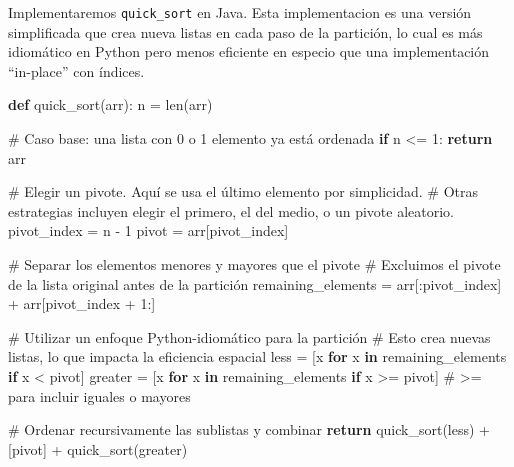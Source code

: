 \documentclass[
  spanish,
  letterpaper,
  DIV=11,
  numbers=noendperiod]{scrreprt}
\newenvironment{Shaded}{\begin{snugshade}}{\end{snugshade}}
\newcommand{\BuiltInTok}[1]{\textcolor[rgb]{0.00,0.23,0.31}{#1}}
\newcommand{\CommentTok}[1]{\textcolor[rgb]{0.37,0.37,0.37}{#1}}
\newcommand{\ControlFlowTok}[1]{\textcolor[rgb]{0.00,0.23,0.31}{\textbf{#1}}}
\newcommand{\DecValTok}[1]{\textcolor[rgb]{0.68,0.00,0.00}{#1}}
\newcommand{\KeywordTok}[1]{\textcolor[rgb]{0.00,0.23,0.31}{\textbf{#1}}}
\newcommand{\NormalTok}[1]{\textcolor[rgb]{0.00,0.23,0.31}{#1}}
\newcommand{\OperatorTok}[1]{\textcolor[rgb]{0.37,0.37,0.37}{#1}}
\begin{document}
Implementaremos \texttt{quick\_sort} en Java. Esta implementacion es una
versión simplificada que crea nueva listas en cada paso de la partición,
lo cual es más idiomático en Python pero menos eficiente en especio que
una implementación ``in-place'' con índices.

\begin{Shaded}
\begin{Highlighting}[]
\KeywordTok{def}\NormalTok{ quick\_sort(arr):}
\NormalTok{    n }\OperatorTok{=} \BuiltInTok{len}\NormalTok{(arr)}
    
    \CommentTok{\# Caso base: una lista con 0 o 1 elemento ya está ordenada}
    \ControlFlowTok{if}\NormalTok{ n }\OperatorTok{\textless{}=} \DecValTok{1}\NormalTok{:}
        \ControlFlowTok{return}\NormalTok{ arr}
    
    \CommentTok{\# Elegir un pivote. Aquí se usa el último elemento por simplicidad.}
    \CommentTok{\# Otras estrategias incluyen elegir el primero, el del medio, o un pivote aleatorio.}
\NormalTok{    pivot\_index }\OperatorTok{=}\NormalTok{ n }\OperatorTok{{-}} \DecValTok{1}
\NormalTok{    pivot }\OperatorTok{=}\NormalTok{ arr[pivot\_index]}
    
    \CommentTok{\# Separar los elementos menores y mayores que el pivote}
    \CommentTok{\# Excluimos el pivote de la lista original antes de la partición}
\NormalTok{    remaining\_elements }\OperatorTok{=}\NormalTok{ arr[:pivot\_index] }\OperatorTok{+}\NormalTok{ arr[pivot\_index }\OperatorTok{+} \DecValTok{1}\NormalTok{:]}
    
    \CommentTok{\# Utilizar un enfoque Python{-}idiomático para la partición}
    \CommentTok{\# Esto crea nuevas listas, lo que impacta la eficiencia espacial}
\NormalTok{    less }\OperatorTok{=}\NormalTok{ [x }\ControlFlowTok{for}\NormalTok{ x }\KeywordTok{in}\NormalTok{ remaining\_elements }\ControlFlowTok{if}\NormalTok{ x }\OperatorTok{\textless{}}\NormalTok{ pivot]}
\NormalTok{    greater }\OperatorTok{=}\NormalTok{ [x }\ControlFlowTok{for}\NormalTok{ x }\KeywordTok{in}\NormalTok{ remaining\_elements }\ControlFlowTok{if}\NormalTok{ x }\OperatorTok{\textgreater{}=}\NormalTok{ pivot]  }\CommentTok{\# \textgreater{}= para incluir iguales o mayores}
    
    \CommentTok{\# Ordenar recursivamente las sublistas y combinar}
    \ControlFlowTok{return}\NormalTok{ quick\_sort(less) }\OperatorTok{+}\NormalTok{ [pivot] }\OperatorTok{+}\NormalTok{ quick\_sort(greater)}
\end{Highlighting}
\end{Shaded}
\end{document}
